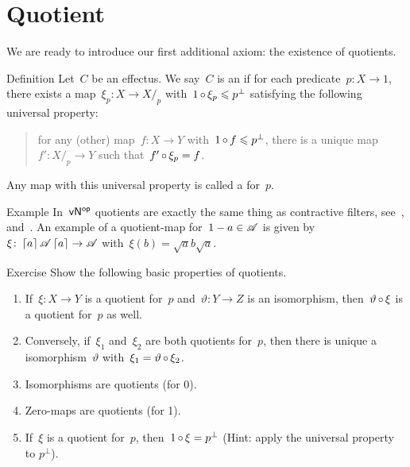 \documentclass[b]{subfiles}
\begin{document}
\section{Quotient}
\begin{parsec}%
\begin{point}%
We are ready to introduce our first additional axiom:
    the existence of quotients.
\end{point}
\begin{point}{Definition}%
Let~$C$ be an effectus.
We say~$C$ is an 
    if for each predicate~$p \colon X \to 1$,
    there exists a map~$\xi_p \colon X \to X/_p$
    with~$1 \mathop{\circ} \xi_p \leqslant p^\perp$
    satisfying the following universal property:
\begin{quote}
    for any (other) map~$f\colon X \to Y$
        with~$1 \mathop{\circ} f \leqslant p^\perp$,
        there is a unique map~$f' \colon X/_p \to Y$
        such that~$f' \mathop{\circ} \xi_p = f$.
\end{quote}
Any  map with this universal property
    is called a  for~$p$.
\end{point}
\begin{point}{Example}%
In~${\mathsf{vN}}{^{\mathsf{op}}}$ quotients are exactly the same thing
    as contractive filters,
    see~, 
    and~.
An example of a quotient-map for~$1-a \in \mathscr{A}$ is given
    by~$\xi\colon \left\lceil a\right\rceil\mathscr{A} \left\lceil a\right\rceil \to \mathscr{A}$
    with~$\xi(b) = \sqrt{a} b \sqrt{a}$.
\end{point}
\begin{point}{Exercise}%
Show the following basic properties of quotients.
\begin{enumerate}
    \item If~$\xi\colon X \to Y$ is a quotient for~$p$
                and~$\vartheta\colon Y \to Z$ is an isomorphism,
                then~$\vartheta \mathop{\circ} \xi$ is a quotient for~$p$
                as well.
    \item Conversely, if~$\xi_1$ and~$\xi_2$
            are both quotients for~$p$,
            then there is unique a isomorphism~$\vartheta$
            with~$\xi_1 = \vartheta \mathop{\circ} \xi_2$.
    \item Isomorphisms are quotients (for 0).
    \item Zero-maps are quotients (for 1).
    \item If~$\xi$ is a quotient for~$p$, then~$1\mathop{\circ} \xi = p^\perp$
                (Hint: apply the universal property to $p^\perp$).

\end{enumerate}
\end{point}
\end{parsec}
\end{document}
